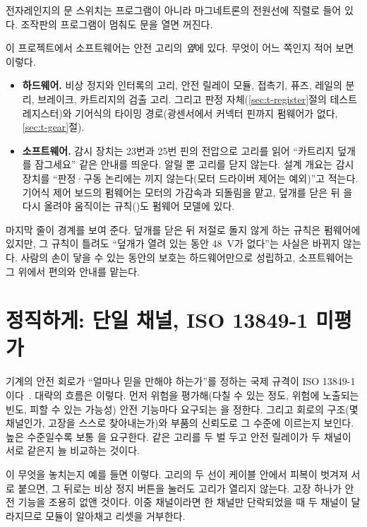 \General 전자레인지의 문 스위치는 프로그램이 아니라 마그네트론의 전원선에 직렬로 들어 있다. 조작판의 프로그램이 멈춰도 문을 열면
꺼진다.

\Ours 이 프로젝트에서 소프트웨어는 안전 고리의 \emph{옆}에 있다. 무엇이 어느 쪽인지 적어 보면 이렇다.
\begin{itemize}
\item \textbf{하드웨어.} 비상 정지와 인터록의 고리, 안전 릴레이 모듈, 접촉기, 퓨즈, 레일의 분리, 브레이크, 카트리지의 검출 고리. 그리고
판정 자체(\ref{sec:t-register}절의 테스트 레지스터)와 기어식의 타이밍 경로(광센서에서 커넥터 핀까지 펌웨어가 없다, \ref{sec:t-gear}절).
\item \textbf{소프트웨어.} 감시 장치는 23번과 25번 핀의 전압으로 고리를 읽어 ``카트리지 덮개를 잠그세요'' 같은 안내를 띄운다. 알릴 뿐 고리를
닫지 않는다. 설계 개요는 감시 장치를 ``판정·구동 논리에는 끼지 않는다(모터 드라이버 제어는 예외)''고 적는다. 기어식 제어 보드의 펌웨어는 모터의 가감속과 되돌림을
맡고, 덮개를 닫은 뒤 을 다시 올려야 움직이는 규칙()도 펌웨어 모델에 있다.
\end{itemize}
마지막 줄이 경계를 보여 준다. 덮개를 닫은 뒤 저절로 돌지 않게 하는 규칙은 펌웨어에 있지만, 그 규칙이 틀려도 ``덮개가 열려 있는 동안
48~V가 없다''는 사실은 바뀌지 않는다. 사람의 손이 닿을 수 있는 동안의 보호는 하드웨어만으로 성립하고, 소프트웨어는 그 위에서 편의와
안내를 맡는다.

\section{정직하게: 단일 채널, ISO 13849-1 미평가}\label{sec:p-honest}

\Why 기계의 안전 회로가 ``얼마나 믿을 만해야 하는가''를 정하는 국제 규격이 ISO 13849-1이다~\cite{iso13849-1}. 대략의 흐름은 이렇다. 먼저
위험을 평가해(다칠 수 있는 정도, 위험에 노출되는 빈도, 피할 수 있는 가능성) 안전 기능마다 요구되는 을 정한다. 그리고 회로의 구조(몇 채널인가, 고장을 스스로 찾아내는가)와 부품의 신뢰도로 그 수준에 이르는지 보인다. 높은 수준일수록
보통 을 요구한다. 같은 고리를 두 벌 두고 안전 릴레이가 두 채널이 서로 같은지 늘 비교하는 것이다.

이 무엇을 놓치는지 예를 들면 이렇다. 고리의 두 선이 케이블 안에서 피복이 벗겨져 서로 붙으면, 그 뒤로는
비상 정지 버튼을 눌러도 고리가 열리지 않는다. 고장 하나가 안전 기능을 조용히 없앤 것이다. 이중 채널이라면 한 채널만 단락되었을 때 두
채널이 달라지므로 모듈이 알아채고 리셋을 거부한다.

